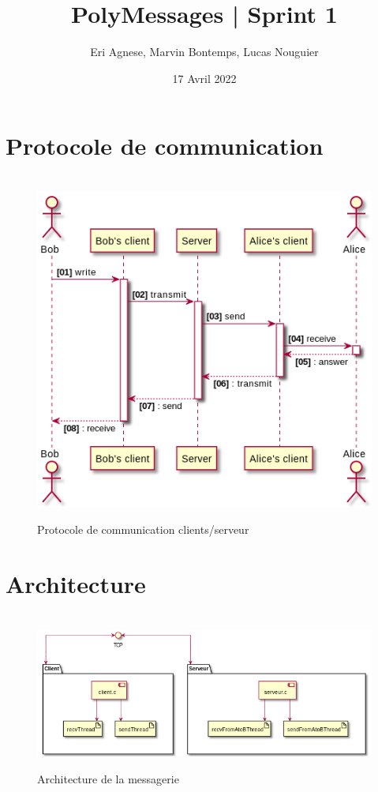 \documentclass[a4paper,12pt]{article}
\title{PolyMessages | Sprint 1}
\author{Eri Agnese, Marvin Bontemps, Lucas Nouguier}
\date{17 Avril 2022}
\begin{document}
\maketitle
\tableofcontents
\clearpage
\hypersetup{linkcolor=red}


\section{Protocole de communication}
\begin{figure}[h]
	\centering
	\hrulefill\\
	\includegraphics[width=0.75\linewidth]{seq_sprint1.png}
	\caption{Protocole de communication clients/serveur}
	\hrulefill
\end{figure}

\section{Architecture}
\begin{figure}[h]
	\centering
	\hrulefill\\
	\includegraphics[width=0.75\linewidth]{architecture.png}
	\caption{Architecture de la messagerie}
	\hrulefill
\end{figure}
\end{document}
